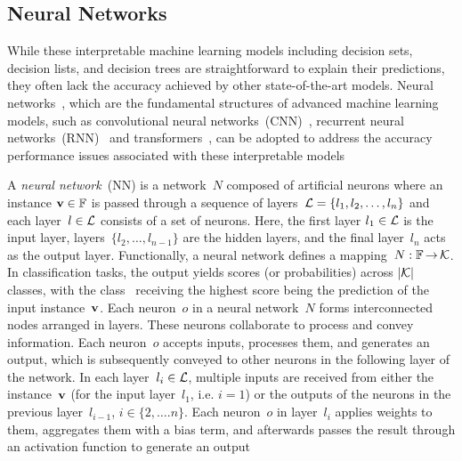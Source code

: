 \subsection{Neural Networks} \label{sec:nn}
While these interpretable machine learning models including decision sets, 
decision lists, and decision trees are straightforward to explain their predictions, 
they often lack the accuracy achieved by other state-of-the-art models. 
%
Neural networks~\cite{schm-nn15}, which are the fundamental structures of 
advanced machine learning models, such as convolutional neural 
networks~(CNN)~\cite{kun-bc80,lbbh-ieee98}, recurrent neural
networks~(RNN)~\cite{elman-cs90} and transformers~\cite{transformer-17}, 
can be adopted to address the accuracy performance issues 
associated with these interpretable models

A \emph{neural network}~(NN) is a network~$N$ composed of
artificial neurons where an instance $\mathbf{v}\in\mathbb{F}$ is
passed through a sequence of layers~${\mathcal{L}} = \{l_1, l_2, \dots, l_n\}$
and each layer~$l\in{\mathcal{L}}$ consists of a set of neurons.
%
Here, the first layer $l_1 \in {\mathcal{L}}$ is the input layer, 
layers~$\{l_2, \dots, l_{n-1}\}$ are the hidden layers, and the final
layer~$l_n$ acts as the output layer.
%
Functionally, a neural network defines a mapping~$N: \mathbb{F} \operatorname*{\rightarrow} {\mathcal{K}}$.
%
In classification tasks, the output yields scores (or probabilities)
across $|{\mathcal{K}}|$ classes, with the class~ receiving the highest
score being the prediction of the input instance~$\mathbf{v}$.
%
Each neuron~$o$ in a neural network~$N$ forms interconnected 
nodes arranged in layers. 
%
These neurons collaborate to process and convey information. 
%
Each neuron~$o$ accepts inputs, processes them, and generates an output, 
which is subsequently conveyed to other neurons in the following layer of 
the network.
%
In each layer~$l_i \in {\mathcal{L}}$, multiple inputs are received from either the 
instance~$\mathbf{v}$ (for the input layer~$l_1$, i.e. $i=1$) or
the outputs of the neurons in the previous layer~$l_{i-1}$,
$i \in \{2, \dots. n\}$.
%
Each neuron~$o$ in layer~$l_i$ applies weights to them, aggregates them
with a bias term, 
and afterwards passes the result through an activation function 
to generate an output~

